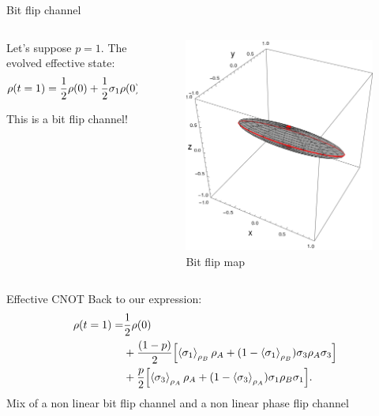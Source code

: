 \begin{frame}{Bit flip channel}
    \begin{columns}
        \begin{column}{0.5\textwidth}
            Let's suppose $p=1$. The evolved effective state:
            \begin{equation*}
              \rho(t=1)=\frac{1}{2}\rho(0)+\frac{1}{2}\sigma_{1}\rho(0)\sigma_{1}.
            \end{equation*}
        
            This is a bit flip channel!
        \end{column}
        \begin{column}{0.5\textwidth}
            \begin{figure}[h!]
                \centering
                \includegraphics[width=0.7\linewidth]{figures/sphere_BitF_t=1.0_z=0.8_p=0.6.png}
                \caption{Bit flip map}
                \label{fig:SWAPFactor2D}
              \end{figure}
        \end{column}
    \end{columns}
\end{frame}


\begin{frame}{Effective CNOT}
    Back to our expression:
    \begin{align*}
        \rho(t=1)=&\frac{1}{2}\rho(0)\\
        &+\frac{(1-p)}{2}\qty[\expval{\sigma_{1}}_{\rho_{B}}\rho_{A}+(1-\expval{\sigma_{1}}_{\rho_{B}})\sigma_{3}\rho_{A}\sigma_{3}]\\
        &+\frac{p}{2}\qty[\expval{\sigma_{3}}_{\rho_{A}}\rho_{A}+(1-\expval{\sigma_{3}}_{\rho_{A}})\sigma_{1}\rho_{B}\sigma_{1}].
    \end{align*}
    Mix of a non linear bit flip channel and a non linear phase flip channel
\end{frame}


